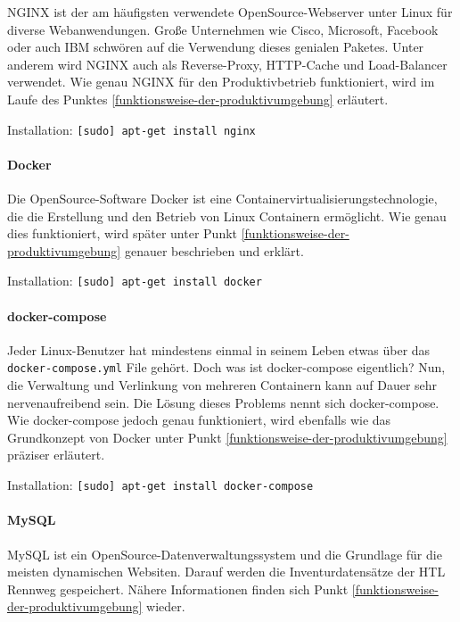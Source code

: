 NGINX ist der am häufigsten verwendete OpenSource-Webserver unter Linux
für diverse Webanwendungen. Große Unternehmen wie Cisco, Microsoft,
Facebook oder auch IBM schwören auf die Verwendung dieses genialen
Paketes. Unter anderem wird NGINX auch als Reverse-Proxy, HTTP-Cache und
Load-Balancer verwendet. Wie genau NGINX für den Produktivbetrieb
funktioniert, wird im Laufe des Punktes
\ref{funktionsweise-der-produktivumgebung} erläutert.

Installation: \texttt{{[}sudo{]}\ apt-get\ install\ nginx}

\hypertarget{docker}{%
\paragraph{Docker}\label{docker}}

Die OpenSource-Software Docker ist eine
Containervirtualisierungstechnologie, die die Erstellung und den Betrieb
von Linux Containern ermöglicht. Wie genau dies funktioniert, wird
später unter Punkt \ref{funktionsweise-der-produktivumgebung} genauer
beschrieben und erklärt.

Installation: \texttt{{[}sudo{]}\ apt-get\ install\ docker}

\hypertarget{docker-compose}{%
\paragraph{docker-compose}\label{docker-compose}}

Jeder Linux-Benutzer hat mindestens einmal in seinem Leben etwas über
das \texttt{docker-compose.yml} File gehört. Doch was ist docker-compose
eigentlich? Nun, die Verwaltung und Verlinkung von mehreren Containern
kann auf Dauer sehr nervenaufreibend sein. Die Lösung dieses Problems
nennt sich docker-compose. Wie docker-compose jedoch genau funktioniert,
wird ebenfalls wie das Grundkonzept von Docker unter Punkt
\ref{funktionsweise-der-produktivumgebung} präziser erläutert.

Installation: \texttt{{[}sudo{]}\ apt-get\ install\ docker-compose}

\hypertarget{mysql}{%
\paragraph{MySQL}\label{mysql}}

MySQL ist ein OpenSource-Datenverwaltungssystem und die Grundlage für
die meisten dynamischen Websiten. Darauf werden die Inventurdatensätze
der HTL Rennweg gespeichert. Nähere Informationen finden sich Punkt
\ref{funktionsweise-der-produktivumgebung} wieder.


